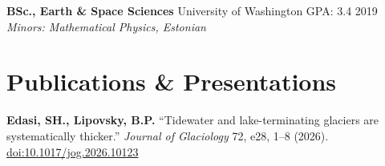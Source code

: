 \documentclass[11pt,a4paper]{article}
\begin{document}
\vspace{0.1cm}
\noindent
\textbf{BSc., Earth \& Space Sciences} \hfill University of Washington \hfill GPA: 3.4 \hfill 2019 \\
\textit{Minors: Mathematical Physics, Estonian}

\section*{Publications \& Presentations}

\noindent
\textbf{Edasi, SH., Lipovsky, B.P.} ``Tidewater and lake-terminating glaciers are systematically thicker.'' \textit{Journal of Glaciology} 72, e28, 1--8 (2026). \href{https://doi.org/10.1017/jog.2026.10123}{doi:10.1017/jog.2026.10123}
\end{document}
